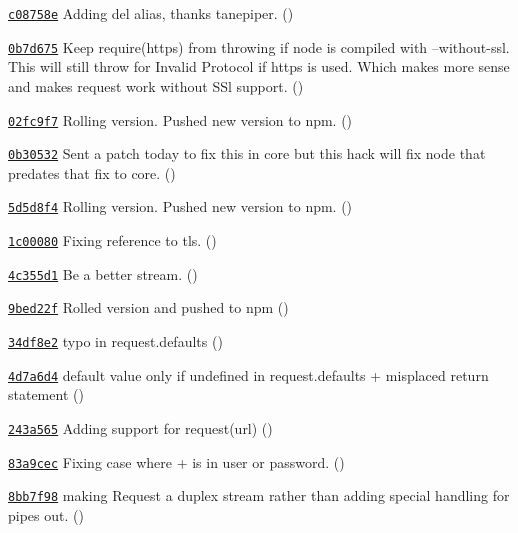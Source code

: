 \begin{DoxyItemize}
\item \href{https://github.com/mikeal/request/commit/c08758e25290ee12278b3eb95d502645e0d66e4e}{\tt c08758e} Adding del alias, thanks tanepiper. ()
\item \href{https://github.com/mikeal/request/commit/0b7d6756c120ebf17ce6c70fc1ff4ecd6850e704}{\tt 0b7d675} Keep require(\textquotesingle{}https\textquotesingle{}) from throwing if node is compiled with --without-\/ssl. This will still throw for Invalid Protocol if https is used. Which makes more sense and makes request work without S\+Sl support. ()
\item \href{https://github.com/mikeal/request/commit/02fc9f7cc8912402a5a98ddefaffa5f6da870562}{\tt 02fc9f7} Rolling version. Pushed new version to npm. ()
\item \href{https://github.com/mikeal/request/commit/0b30532ee1a3cabb177017acfa7885b157031df2}{\tt 0b30532} Sent a patch today to fix this in core but this hack will fix node that predates that fix to core. ()
\item \href{https://github.com/mikeal/request/commit/5d5d8f43156b04fd3ceb312cfdf47cc2b0c4104d}{\tt 5d5d8f4} Rolling version. Pushed new version to npm. ()
\item \href{https://github.com/mikeal/request/commit/1c000809f1795d2e21635a626cf730aba2049d3e}{\tt 1c00080} Fixing reference to tls. ()
\item \href{https://github.com/mikeal/request/commit/4c355d1f87fced167e4b21770bfe6f8208f32b53}{\tt 4c355d1} Be a better stream. ()
\item \href{https://github.com/mikeal/request/commit/9bed22f22e007201d4faeebdb486603c3bb088c3}{\tt 9bed22f} Rolled version and pushed to npm ()
\item \href{https://github.com/mikeal/request/commit/34df8e2301dcfd10705b9ff3b257741b0816c8a1}{\tt 34df8e2} typo in {\ttfamily request.\+defaults} ()
\item \href{https://github.com/mikeal/request/commit/4d7a6d46fa481e43fe873b8c8fad2f7dd816dbb5}{\tt 4d7a6d4} default value only if undefined in {\ttfamily request.\+defaults} + misplaced {\ttfamily return} statement ()
\item \href{https://github.com/mikeal/request/commit/243a56563f1014318a467e46113b2c61b485f377}{\tt 243a565} Adding support for request(url) ()
\item \href{https://github.com/mikeal/request/commit/83a9cec3cb2f7a43a1e10c13da8d0dd72b937965}{\tt 83a9cec} Fixing case where + is in user or password. ()
\item \href{https://github.com/mikeal/request/commit/8bb7f98ba8b78c217552c979811c07f1299318fe}{\tt 8bb7f98} making Request a duplex stream rather than adding special handling for pipes out. ()

\end{DoxyItemize}

